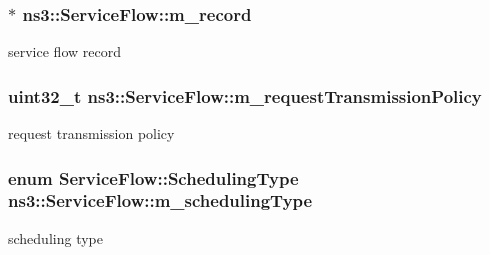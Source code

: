 \subsubsection[{\texorpdfstring{m\+\_\+record}{m_record}}]{$\ast$ ns3\+::\+Service\+Flow\+::m\+\_\+record\hspace{0.3cm}{\ttfamily [private]}}\hypertarget{classns3_1_1ServiceFlow_aa35cc96a2815d89663d87b612e61bb3e}{}\label{classns3_1_1ServiceFlow_aa35cc96a2815d89663d87b612e61bb3e}


service flow record 

\subsubsection[{\texorpdfstring{m\+\_\+request\+Transmission\+Policy}{m_requestTransmissionPolicy}}]{\setlength{\rightskip}{0pt plus 5cm}uint32\+\_\+t ns3\+::\+Service\+Flow\+::m\+\_\+request\+Transmission\+Policy\hspace{0.3cm}{\ttfamily [private]}}\hypertarget{classns3_1_1ServiceFlow_a019520fe5d683d8c79465830166815ce}{}\label{classns3_1_1ServiceFlow_a019520fe5d683d8c79465830166815ce}


request transmission policy 

\subsubsection[{\texorpdfstring{m\+\_\+scheduling\+Type}{m_schedulingType}}]{\setlength{\rightskip}{0pt plus 5cm}enum {\bf Service\+Flow\+::\+Scheduling\+Type} ns3\+::\+Service\+Flow\+::m\+\_\+scheduling\+Type\hspace{0.3cm}{\ttfamily [private]}}\hypertarget{classns3_1_1ServiceFlow_a2d3227119fefd7969d145645cdb693af}{}\label{classns3_1_1ServiceFlow_a2d3227119fefd7969d145645cdb693af}


scheduling type 

